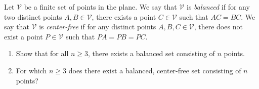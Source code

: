 Let $\mathcal{V}$ be a finite set of points in the plane. We say that $\mathcal{V}$ is \emph{balanced} if for any two distinct points $A, B \in \mathcal{V}$, there exists a point $C \in \mathcal{V}$ such that $AC = BC$. We say that $\mathcal{V}$ is \emph{center-free} if for any distinct points $A, B, C \in \mathcal{V}$, there does not exist a point $P \in \mathcal{V}$ such that $PA = PB = PC$.

\begin{enumerate}
\item[(a)] Show that for all $n \geq 3$, there exists a balanced set consisting of $n$ points.
\item[(b)] For which $n \geq 3$ does there exist a balanced, center-free set consisting of $n$ points?
\end{enumerate}
